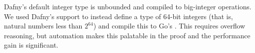 Dafny's default integer type  is unbounded and compiled to big-integer
operations. We used Dafny's
 support to instead define a type of 64-bit integers (that
is, natural numbers less than $2^{64}$) and compile this to Go's .
This requires overflow reasoning, but
automation makes this palatable in the proof and the performance gain is
significant.
